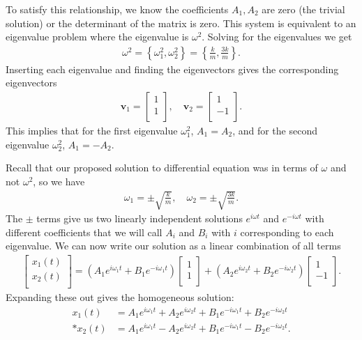 To satisfy this relationship, we know the coefficients $A_1, A_2$ are zero (the trivial solution) or the determinant of the matrix is zero. This system is equivalent to an eigenvalue problem where the eigenvalue is $\omega^2$. Solving for the eigenvalues we get
\begin{align}
  \omega^2 = \left\{ \omega_1^2, \omega_2^2 \right\} = \left\{ \frac{k}{m}, \frac{3k}{m} \right\} .
\end{align}
Inserting each eigenvalue and finding the eigenvectors gives the corresponding eigenvectors
\begin{align}
  \mathbf{v}_1 = \left[ \begin{array}{c} 1 \\ 1 \\ \end{array} \right] , \quad
  \mathbf{v}_2 = \left[ \begin{array}{c} 1 \\ -1 \\ \end{array} \right] .
\end{align} 
This implies that for the first eigenvalue $\omega_1^2$, $A_1 = A_2$, and for the second eigenvalue $\omega_2^2$, $A_1 = -A_2$.

Recall that our proposed solution to differential equation was in terms of $\omega$ and not $\omega^2$, so we have
\begin{align}
  \omega_1 = \pm \sqrt{\frac{k}{m}}, \quad \omega_2 = \pm \sqrt{\frac{3k}{m}} .
\end{align}
The $\pm$ terms give us two linearly independent solutions $e^{i \omega t}$ and $e^{-i \omega t}$ with different coefficients that we will call $A_i$ and $B_i$ with $i$ corresponding to each eigenvalue. We can now write our solution as a linear combination of all terms
\begin{align}
  \left[ \begin{array}{c} x_1(t) \\ x_2(t) \\ \end{array} \right] =
  \left( A_1 e^{i \omega_1 t} + B_1 e^{-i \omega_1 t} \right) \left[ \begin{array}{c} 1 \\ 1 \\ \end{array} \right] +
  \left( A_2 e^{i \omega_2 t} + B_2 e^{-i \omega_2 t} \right) \left[ \begin{array}{c} 1 \\ -1 \\ \end{array} \right] .
\end{align}
Expanding these out gives the homogeneous solution:
\begin{subequations}
\begin{align}
  x_1(t) &= A_1 e^{i \omega_1 t} + A_2 e^{i \omega_2 t} + B_1 e^{-i \omega_1 t} + B_2 e^{-i \omega_2 t} \\*
  x_2(t) &= A_1 e^{i \omega_1 t} - A_2 e^{i \omega_2 t} + B_1 e^{-i \omega_1 t} - B_2 e^{-i \omega_2 t} .
\end{align}
\end{subequations}

